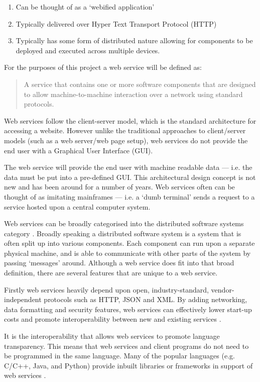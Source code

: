 \begin{enumerate}
  \item Can be thought of as a  `webified application'
  \item Typically delivered over Hyper Text Transport Protocol (HTTP)
  \item Typically has some form of distributed nature allowing for components 
  to be deployed and executed across multiple devices.
\end{enumerate}

For the purposes of this project a web service will be defined as:

\begin{quote}
  A service that contains one or more software components that are designed to 
  allow machine-to-machine interaction over a network using standard protocols.
\end{quote}

Web services follow the client-server model, which is the standard architecture
for accessing a website. However unlike the traditional approaches to 
client/server models (such as a web server/web page setup), web services do not
provide the end user with a Graphical User Interface (GUI).

The web service will provide the end user with machine readable data --- i.e. 
the data must be put into a pre-defined GUI. This architectural design concept 
is not new and has been around for a number of years. Web services often can be
thought of as imitating mainframes --- i.e. a `dumb terminal' sends a request 
to a service hosted upon a central computer system.

Web services can be broadly categorised into the distributed software systems 
category \citep{kalin13}. Broadly speaking a distributed software system is a 
system that is often split up into various components. Each component can run 
upon a separate physical machine, and is able to communicate with other parts 
of the system by passing `messages' around. Although a web service does fit 
into that broad definition, there are several features that are unique to a 
web service.

Firstly web services heavily depend upon open, industry-standard, 
vendor-independent protocols such as HTTP, JSON and XML. By adding networking, 
data formatting and security features, web services can effectively lower 
start-up costs and promote interoperability between new and existing services 
\citep{kalin13}.

It is the interoperability that allows web services to promote language 
transparency. This means that web services and client programs do not need to 
be programmed in the same language. Many of the popular languages (e.g. C/C++,
Java, and Python) provide inbuilt libraries or frameworks in support of web 
services \citep{kalin13}.


